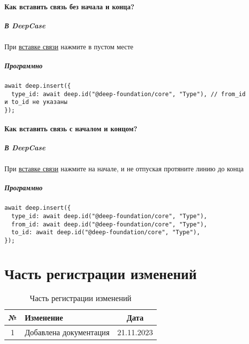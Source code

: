 \documentclass{article}
\begin{document}
\paragraph{Как вставить связь без начала и
  конца?}\hypertarget{FAQ.HowToInsertLinkWithoutFromAndTo}{}
\subparagraph{В DeepCase}
При \hyperlink{DeepCase.InsertLink.Description}{вставке связи} нажмите в пустом
месте
\subparagraph{Программно}
\begin{verbatim}
await deep.insert({
  type_id: await deep.id("@deep-foundation/core", "Type"), // from_id и to_id не указаны
});
\end{verbatim}
\paragraph{Как вставить связь с началом и
  концом?}\hypertarget{FAQ.HowToInsertLinkWithFromAndTo}{}
\subparagraph{В DeepCase}
При \hyperlink{DeepCase.InsertLink.Description}{вставке связи} нажмите на
начале, и не отпуская протяните линию до конца
\subparagraph{Программно}
\begin{verbatim}
await deep.insert({
  type_id: await deep.id("@deep-foundation/core", "Type"), 
  from_id: await deep.id("@deep-foundation/core", "Type"),
  to_id: await deep.id("@deep-foundation/core", "Type"),
});
\end{verbatim}

\section{Часть регистрации изменений}

\begin{table}[h]
  \centering
  \caption{Часть регистрации изменений}
  \begin{tabular}{|c|p{8cm}|c|}
    \hline
    \textbf{№} & \textbf{Изменение}     & \textbf{Дата} \\
    \hline
    1          & Добавлена документация & 21.11.2023    \\
    \hline
  \end{tabular}
\end{table}
\end{document}
